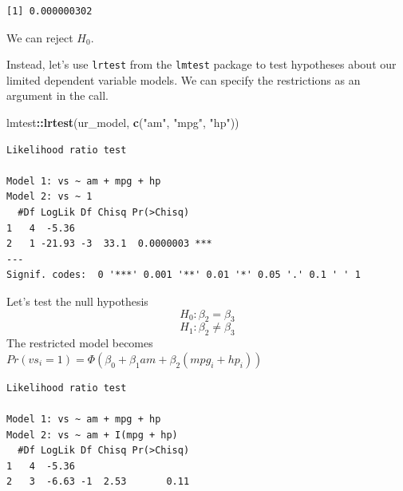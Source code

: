 \documentclass[]{book}
\newenvironment{Shaded}{\begin{snugshade}}{\end{snugshade}}
\newcommand{\DataTypeTok}[1]{\textcolor[rgb]{0.13,0.29,0.53}{#1}}
\newcommand{\KeywordTok}[1]{\textcolor[rgb]{0.13,0.29,0.53}{\textbf{#1}}}
\newcommand{\NormalTok}[1]{#1}
\newcommand{\OperatorTok}[1]{\textcolor[rgb]{0.81,0.36,0.00}{\textbf{#1}}}
\newcommand{\StringTok}[1]{\textcolor[rgb]{0.31,0.60,0.02}{#1}}
\begin{document}
\begin{verbatim}
[1] 0.000000302
\end{verbatim}

We can reject \(H_0\).

Instead, let's use \texttt{lrtest} from the \texttt{lmtest} package to test hypotheses about our limited dependent variable models. We can specify the restrictions as an argument in the call.

\begin{Shaded}
\begin{Highlighting}[]
\NormalTok{lmtest}\OperatorTok{::}\KeywordTok{lrtest}\NormalTok{(ur_model, }\KeywordTok{c}\NormalTok{(}\StringTok{"am"}\NormalTok{, }\StringTok{"mpg"}\NormalTok{, }\StringTok{"hp"}\NormalTok{))}
\end{Highlighting}
\end{Shaded}

\begin{verbatim}
Likelihood ratio test

Model 1: vs ~ am + mpg + hp
Model 2: vs ~ 1
  #Df LogLik Df Chisq Pr(>Chisq)    
1   4  -5.36                        
2   1 -21.93 -3  33.1  0.0000003 ***
---
Signif. codes:  0 '***' 0.001 '**' 0.01 '*' 0.05 '.' 0.1 ' ' 1
\end{verbatim}

Let's test the null hypothesis \[H_0:\beta_2=\beta_3\] \[H_1: \beta_2\ne\beta_3\]
The restricted model becomes \(Pr(vs_i=1)=\Phi(\beta_0+\beta_1am+\beta_2(mpg_i+hp_i))\)

\begin{Shaded}
\end{Shaded}

\begin{verbatim}
Likelihood ratio test

Model 1: vs ~ am + mpg + hp
Model 2: vs ~ am + I(mpg + hp)
  #Df LogLik Df Chisq Pr(>Chisq)
1   4  -5.36                    
2   3  -6.63 -1  2.53       0.11
\end{verbatim}
\end{document}
